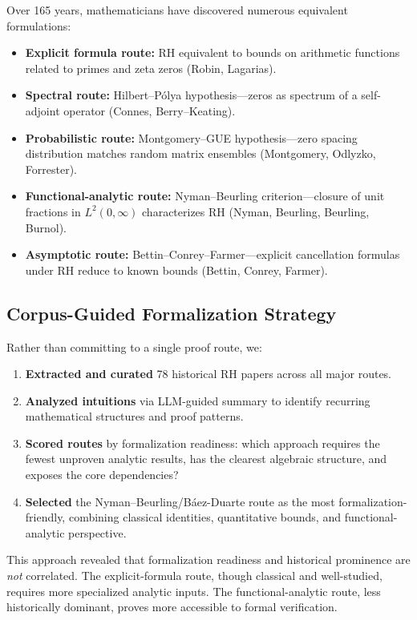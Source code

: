 \documentclass[11pt,a4paper]{article}
\begin{document}
Over 165 years, mathematicians have discovered numerous equivalent formulations:
\begin{itemize}
  \item \textbf{Explicit formula route:} RH equivalent to bounds on arithmetic functions related to primes and zeta zeros (Robin, Lagarias).
  \item \textbf{Spectral route:} Hilbert--Pólya hypothesis—zeros as spectrum of a self-adjoint operator (Connes, Berry--Keating).
  \item \textbf{Probabilistic route:} Montgomery--GUE hypothesis—zero spacing distribution matches random matrix ensembles (Montgomery, Odlyzko, Forrester).
  \item \textbf{Functional-analytic route:} Nyman--Beurling criterion—closure of unit fractions in $L^2(0,\infty)$ characterizes RH (Nyman, Beurling, Beurling, Burnol).
  \item \textbf{Asymptotic route:} Bettin--Conrey--Farmer—explicit cancellation formulas under RH reduce to known bounds (Bettin, Conrey, Farmer).
\end{itemize}

\subsection{Corpus-Guided Formalization Strategy}

Rather than committing to a single proof route, we:

\begin{enumerate}
  \item \textbf{Extracted and curated} 78 historical RH papers across all major routes.
  \item \textbf{Analyzed intuitions} via LLM-guided summary to identify recurring mathematical structures and proof patterns.
  \item \textbf{Scored routes} by formalization readiness: which approach requires the fewest unproven analytic results, has the clearest algebraic structure, and exposes the core dependencies?
  \item \textbf{Selected} the Nyman--Beurling/Báez-Duarte route as the most formalization-friendly, combining classical identities, quantitative bounds, and functional-analytic perspective.
\end{enumerate}

This approach revealed that formalization readiness and historical prominence are \emph{not} correlated. The explicit-formula route, though classical and well-studied, requires more specialized analytic inputs. The functional-analytic route, less historically dominant, proves more accessible to formal verification.
\end{document}
